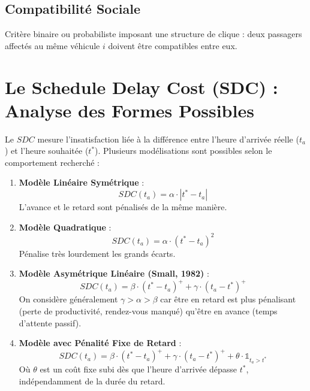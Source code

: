 \documentclass[11pt,a4paper]{article}
\begin{document}
\subsection{Compatibilité Sociale}
Critère binaire ou probabiliste imposant une structure de clique : deux passagers affectés au même véhicule $i$ doivent être compatibles entre eux.

\section{Le Schedule Delay Cost (SDC) : Analyse des Formes Possibles}

Le $SDC$ mesure l'insatisfaction liée à la différence entre l'heure d'arrivée réelle ($t_a$) et l'heure souhaitée ($t^*$). Plusieurs modélisations sont possibles selon le comportement recherché :

\begin{enumerate}
    \item \textbf{Modèle Linéaire Symétrique} :
    \begin{equation}
        SDC(t_a) = \alpha \cdot |t^* - t_a|
    \end{equation}
    L'avance et le retard sont pénalisés de la même manière.

    \item \textbf{Modèle Quadratique} :
    \begin{equation}
        SDC(t_a) = \alpha \cdot (t^* - t_a)^2
    \end{equation}
    Pénalise très lourdement les grands écarts.
    \item \textbf{Modèle Asymétrique Linéaire (Small, 1982)} :
    \begin{equation}
        SDC(t_a) = \beta \cdot (t^* - t_a)^+ + \gamma \cdot (t_a - t^*)^+
    \end{equation}
    On considère généralement $\gamma > \alpha > \beta$ car être en retard est plus pénalisant (perte de productivité, rendez-vous manqué) qu'être en avance (temps d'attente passif).

    \item \textbf{Modèle avec Pénalité Fixe de Retard} :
    \begin{equation}
        SDC(t_a) = \beta \cdot (t^* - t_a)^+ + \gamma \cdot (t_a - t^*)^+ + \theta \cdot \mathbb{1}_{t_a > t^*}
    \end{equation}
    Où $\theta$ est un coût fixe subi dès que l'heure d'arrivée dépasse $t^*$, indépendamment de la durée du retard.
\end{enumerate}
\end{document}
